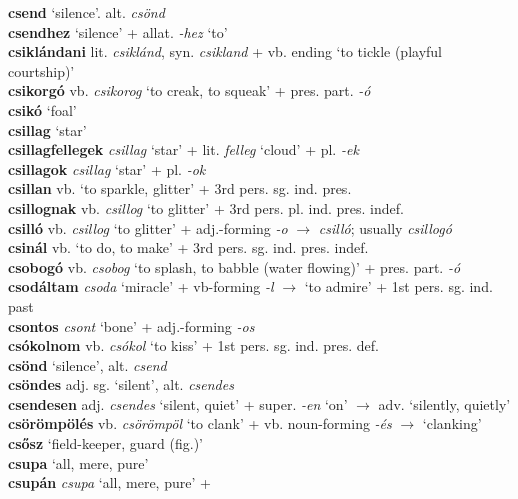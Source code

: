 \documentclass[11pt]{article}
\begin{document}
\textbf{csend} `silence'. alt. \emph{csönd} \\
\textbf{csendhez} `silence' + allat. \emph{-hez} `to' \\
\textbf{csiklándani} lit. \emph{csiklánd}, syn. \emph{csikland} +
vb. ending `to tickle (playful courtship)' \\
\textbf{csikorgó} vb. \emph{csikorog} `to creak, to squeak' + pres. part. \emph{-ó} \\
\textbf{csikó} `foal' \\
\textbf{csillag} `star' \\
\textbf{csillagfellegek} \emph{csillag} `star' + lit. \emph{felleg}
`cloud' + pl. \emph{-ek} \\
\textbf{csillagok} \emph{csillag} `star' + pl. \emph{-ok} \\
\textbf{csillan} vb. `to sparkle, glitter' + 3rd pers. sg. ind. pres. \\
\textbf{csillognak} vb. \emph{csillog} `to glitter' + 3rd
pers. pl. ind. pres. indef. \\
\textbf{csilló} vb. \emph{csillog} `to glitter' +
 adj.\hyp{}forming \emph{-o} $\rightarrow$ \emph{csilló};
 usually \emph{csillogó} \\
 \textbf{csinál} vb. `to do, to make' + 3rd
 pers. sg. ind. pres. indef. \\
\textbf{csobogó} vb. \emph{csobog} `to splash, to babble (water
 flowing)' + pres. part. \emph{-ó} \\
\textbf{csodáltam} \emph{csoda} `miracle' + vb\hyp{}forming \emph{-l}
$\rightarrow$ `to admire' + 1st pers. sg. ind. past \\
\textbf{csontos} \emph{csont} `bone' + adj.\hyp{}forming \emph{-os} \\
\textbf{csókolnom} vb. \emph{csókol} `to kiss' + 1st
pers. sg. ind. pres. def. \\
\textbf{csönd} `silence', alt. \emph{csend} \\
\textbf{csöndes} adj. sg. `silent', alt. \emph{csendes} \\
\textbf{csendesen} adj. \emph{csendes} `silent, quiet' +
super. \emph{-en} `on' $\rightarrow$ adv. `silently, quietly' \\
\textbf{csörömpölés} vb. \emph{csörömpöl} `to clank' +
  vb. noun\hyp{}forming \emph{-és} $\rightarrow$ `clanking' \\
\textbf{csősz} `field-keeper, guard (fig.)' \\
\textbf{csupa} `all, mere, pure' \\
\textbf{csupán} \emph{csupa} `all, mere, pure' +
\end{document}
